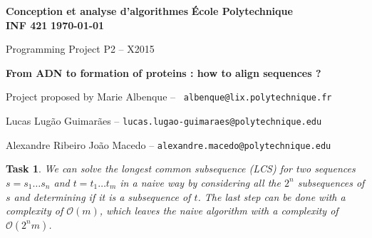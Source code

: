 \documentclass[11pt]{article} %
\theoremstyle{problemstyle}
\newtheorem{exercise}{Task}	%
\theoremstyle{problemstyle}
\renewcommand*{\O}{\mathcal{O}}
\begin{document}
\noindent
\normalsize\textbf{Conception et analyse d'algorithmes} \hfill \textbf{École Polytechnique}\\
\normalsize\textbf{INF 421} \hfill \textbf{\today}\vspace{20pt}
\centerline{\Large Programming Project P2 – X2015}\vspace{5pt}
\centerline{\Large \textbf{From ADN to formation of proteins : how to align sequences ?}}\vspace{3pt}
\centerline{Project proposed by Marie Albenque -- \texttt{ albenque@lix.polytechnique.fr}}\vspace{13pt}
\centerline{Lucas Lugão Guimarães -- \texttt{lucas.lugao-guimaraes@polytechnique.edu}}
\centerline{Alexandre Ribeiro João Macedo --  \texttt{alexandre.macedo@polytechnique.edu}}\vspace{20pt}


\begin{exercise} %
We can solve the longest common subsequence (LCS) for two sequences $s=s_1\dots s_n$ and $t=t_1\dots t_m$ in a naive way by considering all the $2^{n}$ subsequences of $s$ and determining if it is a subsequence of $t$. The last step can be done with a complexity of $\O(m)$, which leaves the naive algorithm with a complexity of $\O(2^{n}m)$.
\end{exercise}
\end{document}
